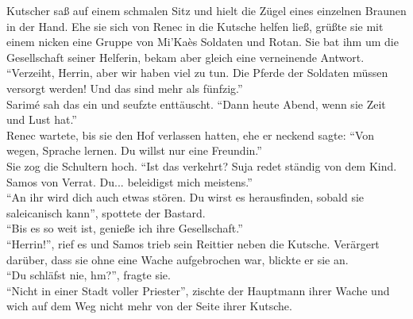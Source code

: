 Kutscher saß auf einem schmalen Sitz und hielt die Zügel eines einzelnen Braunen in der Hand. Ehe 
sie sich von Renec in die Kutsche helfen ließ, grüßte sie mit einem nicken eine Gruppe von Mi'Kaès 
Soldaten und Rotan. Sie bat ihm um die Gesellschaft seiner Helferin, bekam aber gleich eine 
verneinende Antwort. ``Verzeiht, Herrin, aber wir haben viel zu tun. Die Pferde der Soldaten müssen 
versorgt werden! Und das sind mehr als fünfzig.''\\
Sarimé sah das ein und seufzte enttäuscht. ``Dann heute Abend, wenn sie Zeit und Lust hat.''\\
Renec wartete, bis sie den Hof verlassen hatten, ehe er neckend sagte: ``Von wegen, Sprache lernen. 
Du willst nur eine Freundin.''\\
Sie zog die Schultern hoch. ``Ist das verkehrt? Suja redet ständig von dem Kind. Samos von Verrat. 
Du... beleidigst mich meistens.''\\
``An ihr wird dich auch etwas stören. Du wirst es herausfinden, sobald sie saleicanisch kann'', 
spottete der Bastard.\\
``Bis es so weit ist, genieße ich ihre Gesellschaft.''\\
``Herrin!'', rief es und Samos trieb sein Reittier neben die Kutsche. Verärgert darüber, dass sie 
ohne eine Wache aufgebrochen war, blickte er sie an.\\
``Du schläfst nie, hm?'', fragte sie.\\
``Nicht in einer Stadt voller Priester'', zischte der Hauptmann ihrer Wache und wich auf dem Weg 
nicht mehr von der Seite ihrer Kutsche.

